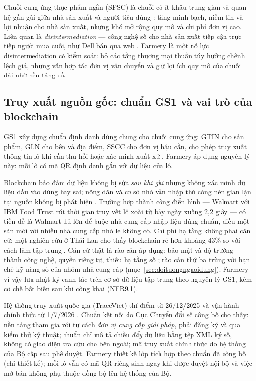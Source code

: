 Chuỗi cung ứng thực phẩm ngắn (SFSC) là chuỗi có ít khâu trung gian và quan hệ gần gũi giữa nhà sản xuất và người tiêu dùng \parencite{tapchicongsan2018}: tăng minh bạch, niềm tin và lợi nhuận cho nhà sản xuất, nhưng khó mở rộng quy mô và chi phí đơn vị cao. Liên quan là \emph{disintermediation} --- công nghệ số cho nhà sản xuất tiếp cận trực tiếp người mua cuối, như Dell bán qua web \parencite{britannica_disintermediation}. Farmery là một nỗ lực disintermediation có kiểm soát: bỏ các tầng thương mại thuần túy hưởng chênh lệch giá, nhưng vẫn hợp tác đơn vị vận chuyển và giữ lợi ích quy mô của chuỗi dài nhờ nền tảng số.

\subsection{Truy xuất nguồn gốc: chuẩn GS1 và vai trò của blockchain}
\label{subsec:gs1blockchain}

GS1 xây dựng chuẩn định danh dùng chung cho chuỗi cung ứng: GTIN cho sản phẩm, GLN cho bên và địa điểm, SSCC cho đơn vị hậu cần, cho phép truy xuất thông tin lô khi cần thu hồi hoặc xác minh xuất xứ \parencite{gs1_keys}. Farmery áp dụng nguyên lý này: mỗi lô có mã QR định danh gắn với dữ liệu của lô.

Blockchain bảo đảm dữ liệu không bị sửa \emph{sau khi ghi} nhưng không xác minh dữ liệu đầu vào đúng hay sai; nông dân và cơ sở nhỏ vẫn nhập thủ công nên gian lận tại nguồn không bị phát hiện \parencite{bath_blockchain}. Trường hợp thành công điển hình --- Walmart với IBM Food Trust rút thời gian truy vết lô xoài từ bảy ngày xuống 2,2 giây \parencite{walmart_ibm_foodtrust} --- có tiền đề là Walmart đủ lớn để buộc nhà cung cấp nhập liệu đúng chuẩn, điều một sàn mới với nhiều nhà cung cấp nhỏ lẻ không có. Chi phí hạ tầng không phải căn cứ: một nghiên cứu ở Thái Lan cho thấy blockchain rẻ hơn khoảng 43\% so với cách làm tập trung \parencite{thai_broiler_blockchain_2025}. Căn cứ thật là rào cản áp dụng: bảo mật và độ trưởng thành công nghệ, quyền riêng tư, thiếu hạ tầng số \parencite{perishable_blockchain_barriers_2025}; rào cản thứ ba trùng với hạn chế kỹ năng số của nhóm nhà cung cấp (mục~\ref{sec:doituongnguoidung}). Farmery vì vậy lưu nhật ký canh tác trên cơ sở dữ liệu tập trung theo nguyên lý GS1, kèm cơ chế bất biến sau khi công khai (NFR9.1).

Hệ thống truy xuất quốc gia (TraceViet) thí điểm từ 26/12/2025 và vận hành chính thức từ 1/7/2026 \parencite{tuoitre_traceviet_2025, mae_traceviet_2026}. Chuẩn kết nối do Cục Chuyển đổi số công bố \parencite{traceviet_chuanketnoi} cho thấy: nền tảng tham gia với tư cách \emph{đơn vị cung cấp giải pháp}, phải đăng ký và qua kiểm thử kỹ thuật; chuẩn chỉ mô tả chiều \emph{đẩy} dữ liệu bằng tệp XML ký số, không có giao diện tra cứu cho bên ngoài; mã truy xuất chính thức do hệ thống của Bộ cấp sau phê duyệt. Farmery thiết kế lớp tích hợp theo chuẩn đã công bố (chỉ thiết kế); mỗi lô vẫn có mã QR riêng sinh ngay khi được duyệt nội bộ và việc mở bán không phụ thuộc đồng bộ lên hệ thống của Bộ.

